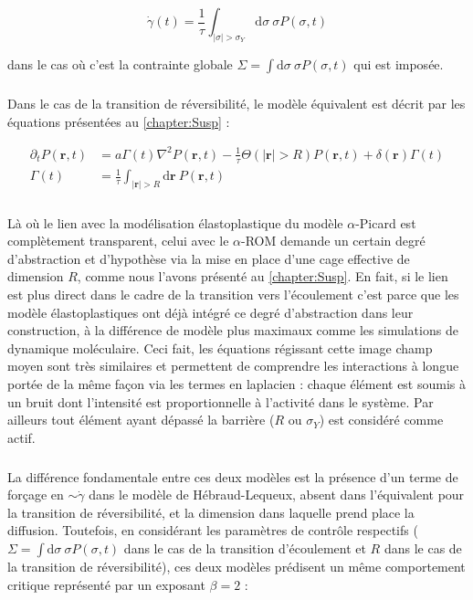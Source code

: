 \begin{equation}
	\dot{\gamma} (t) = \frac{1}{\tau}\int_{|\sigma|>\sigma_Y}\mathrm{d}\sigma ~ \sigma P(\sigma, t)
\end{equation}

\noindent dans le cas où c'est la contrainte globale $\Sigma = \int \mathrm{d}\sigma ~ \sigma P(\sigma,t)$ qui est imposée.

\subparagraph{}Dans le cas de la transition de réversibilité, le modèle équivalent est décrit par les équations présentées au \autoref{chapter:Susp} :

\begin{equation}
\begin{aligned}
    \partial_t P(\mathbf{r}, t) &= a\Gamma (t)\nabla^2 P(\mathbf{r}, t) - \frac{1}{\tau}\Theta(|\mathbf{r}|>R)P(\mathbf{r}, t) + \delta(\mathbf{r})\Gamma (t)\\
     \Gamma (t) &= \frac{1}{\tau}\int_{|\mathbf{r}|>R}\mathrm{d}\mathbf{r}~P(\mathbf{r}, t)
    \label{eq:muHLDiff}
\end{aligned}
\end{equation} 

\subparagraph{}Là où le lien avec la modélisation élastoplastique du modèle $\alpha$-Picard est complètement transparent, celui avec le $\alpha$-ROM demande un certain degré d'abstraction et d'hypothèse via la mise en place d'une cage effective de dimension $R$, comme nous l'avons présenté au \autoref{chapter:Susp}. En fait, si le lien est plus direct dans le cadre de la transition vers l'écoulement c'est parce que les modèle élastoplastiques ont déjà intégré ce degré d'abstraction dans leur construction, à la différence de modèle plus maximaux comme les simulations de dynamique moléculaire. Ceci fait, les équations régissant cette image champ moyen sont très similaires et permettent de comprendre les interactions à longue portée de la même façon via les termes en laplacien : chaque élément est soumis à un bruit dont l'intensité est proportionnelle à l'activité dans le système. Par ailleurs tout élément ayant dépassé la barrière ($R$ ou $\sigma_Y$) est considéré comme actif.

\subparagraph{}La différence fondamentale entre ces deux modèles est la présence d'un terme de forçage en $\sim \dot{\gamma}$ dans le modèle de Hébraud-Lequeux, absent dans l'équivalent pour la transition de réversibilité, et la dimension dans laquelle prend place la diffusion. Toutefois, en considérant les paramètres de contrôle respectifs ($\Sigma = \int \mathrm{d}\sigma ~ \sigma P(\sigma,t)$ dans le cas de la transition d'écoulement et $R$ dans le cas de la transition de réversibilité), ces deux modèles prédisent un même comportement critique représenté par un exposant $\beta = 2$ :

